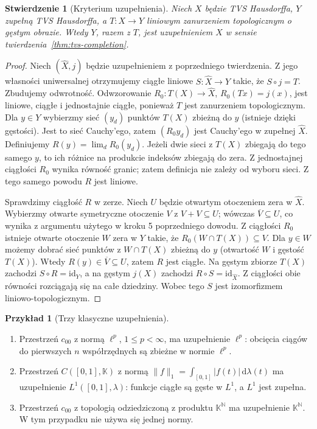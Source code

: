 \documentclass[11pt,a4paper]{article}
\numberwithin{equation}{section}
\theoremstyle{plain}
\newtheorem{stwierdzenie}[twierdzenie]{Stwierdzenie}
\theoremstyle{definition}
\newtheorem{przyklad}[twierdzenie]{Przykład}
\theoremstyle{remark}
\newcommand{\N}{\mathbb N}
\newcommand{\K}{\mathbb K}
\begin{document}
\begin{stwierdzenie}[Kryterium uzupełnienia]\label{prop:completion-criterion}
Niech $X$ będzie TVS Hausdorffa, $Y$ zupełną TVS Hausdorffa,
a $T:X\to Y$ liniowym zanurzeniem topologicznym o gęstym obrazie.
Wtedy $Y$, razem z $T$, jest uzupełnieniem $X$ w sensie
twierdzenia~\ref{thm:tvs-completion}.
\end{stwierdzenie}
\begin{proof}
Niech $(\widehat X,j)$ będzie uzupełnieniem z poprzedniego
twierdzenia. Z jego własności uniwersalnej otrzymujemy ciągłe
liniowe $S:\widehat X\to Y$ takie, że $S\circ j=T$.
Zbudujemy odwrotność. Odwzorowanie
$R_0:T(X)\to\widehat X$, $R_0(Tx)=j(x)$, jest liniowe,
ciągłe i jednostajnie ciągłe, ponieważ $T$ jest zanurzeniem
topologicznym. Dla $y\in Y$ wybierzmy sieć
$(y_d)$ punktów $T(X)$ zbieżną do $y$ (istnieje dzięki
gęstości). Jest to sieć Cauchy'ego, zatem $(R_0y_d)$
jest Cauchy'ego w zupełnej $\widehat X$. Definiujemy
$R(y)=\lim_d R_0(y_d)$.
Jeżeli dwie sieci z $T(X)$ zbiegają do tego samego $y$,
to ich różnice na produkcie indeksów zbiegają do zera.
Z jednostajnej ciągłości $R_0$ wynika równość granic;
zatem definicja nie zależy od wyboru sieci. Z tego samego
powodu $R$ jest liniowe.

Sprawdzimy ciągłość $R$ w zerze. Niech $U$ będzie otwartym
otoczeniem zera w $\widehat X$. Wybierzmy otwarte
symetryczne otoczenie $V$ z $V+V\subseteq U$;
wówczas $\overline V\subseteq U$, co wynika z argumentu
użytego w kroku 5 poprzedniego dowodu. Z ciągłości $R_0$
istnieje otwarte otoczenie $W$ zera w $Y$ takie, że
$R_0(W\cap T(X))\subseteq V$.
Dla $y\in W$ możemy dobrać sieć punktów z $W\cap T(X)$
zbieżną do $y$ (otwartość $W$ i gęstość $T(X)$).
Wtedy $R(y)\in\overline V\subseteq U$, zatem $R$
jest ciągłe. Na gęstym zbiorze $T(X)$ zachodzi
$S\circ R=\mathrm{id}_Y$, a na gęstym $j(X)$ zachodzi
$R\circ S=\mathrm{id}_{\widehat X}$. Z ciągłości obie
równości rozciągają się na całe dziedziny. Wobec tego
$S$ jest izomorfizmem liniowo-topologicznym.
\end{proof}

\begin{przyklad}[Trzy klasyczne uzupełnienia]
\begin{enumerate}[label=\textup{(\roman*)}]
\item Przestrzeń $c_{00}$ z normą $\ell^p$, $1\leq p<\infty$,
      ma uzupełnienie $\ell^p$: obcięcia ciągów do pierwszych
      $n$ współrzędnych są zbieżne w normie $\ell^p$.
\item Przestrzeń $C([0,1],\K)$ z normą
      $\|f\|_1=\int_{[0,1]}|f(t)|\,\mathrm d\lambda(t)$
      ma uzupełnienie $L^1([0,1],\lambda)$: funkcje ciągłe
      są gęste w $L^1$, a $L^1$ jest zupełna.
\item Przestrzeń $c_{00}$ z topologią odziedziczoną
      z produktu $\K^{\N}$ ma uzupełnienie $\K^{\N}$.
      W tym przypadku nie używa się jednej normy.
\end{enumerate}
\end{przyklad}
\end{document}
